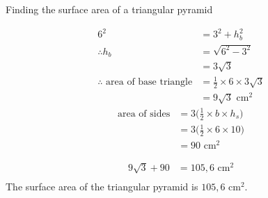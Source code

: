 \begin{wex}{Finding the surface area of a triangular pyramid}
{\begin{align*}
6^2 &= 3^2+h_b^2\\
\therefore h_b&=\sqrt{6^2-3^2}\\
&=3\sqrt{3}\\
\therefore \mbox{ area of base triangle} &= \frac{1}{2} \times 6 \times 3\sqrt{3}\\
&=9\sqrt{3}\mbox{ cm}^2
\end{align*}
\begin{align*}
 \mbox{area of sides} &= 3\Big(\frac{1}{2} \times b\times h_s\Big)\\
&=3\Big(\frac{1}{2} \times 6 \times 10\Big)\\
&=90\mbox{ cm}^2
\end{align*}

\begin{align*}
9\sqrt{3} + 90&=105,6\mbox{ cm}^2\\

\end{align*}
The surface area of the triangular pyramid is $105,6$ cm$^{2}$.
}
\end{wex}

